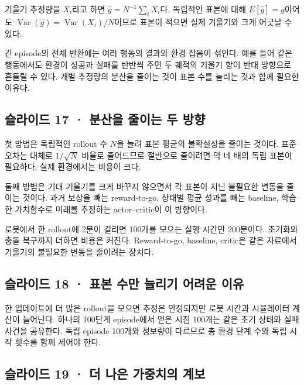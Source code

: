 \documentclass[11pt,a4paper]{article}
\begin{document}
기울기 추정량을 $X_i$라고 하면 $\widehat g=N^{-1}\sum_i X_i$다. 독립적인 표본에 대해 $E[\widehat g]=g$이어도 $\operatorname{Var}(\widehat g)=\operatorname{Var}(X_i)/N$이므로 표본이 적으면 실제 기울기와 크게 어긋날 수 있다.\par

긴 episode의 전체 반환에는 여러 행동의 결과와 환경 잡음이 섞인다. 예를 들어 같은 행동에서도 환경이 성공과 실패를 반반씩 주면 두 궤적의 기울기 항이 반대 방향으로 흔들릴 수 있다. 개별 추정량의 분산을 줄이는 것이 표본 수를 늘리는 것과 함께 필요한 이유다.\par

\subsection{슬라이드 17 · 분산을 줄이는 두 방향}

첫 방법은 독립적인 rollout 수 $N$을 늘려 표본 평균의 불확실성을 줄이는 것이다. 표준오차는 대체로 $1/\sqrt N$ 비율로 줄어드므로 절반으로 줄이려면 약 네 배의 독립 표본이 필요하다. 실제 환경에서는 비용이 크다.\par

둘째 방법은 기대 기울기를 크게 바꾸지 않으면서 각 표본이 지닌 불필요한 변동을 줄이는 것이다. 과거 보상을 빼는 reward-to-go, 상태별 평균 성과를 빼는 baseline, 학습한 가치함수로 미래를 추정하는 actor–critic이 이 방향이다.\par

로봇에서 한 rollout에 2분이 걸리면 100개를 모으는 실행 시간만 200분이다. 초기화와 충돌 복구까지 더하면 비용은 커진다. Reward-to-go, baseline, critic은 같은 자료에서 기울기의 불필요한 변동을 줄이려는 장치다.\par

\subsection{슬라이드 18 · 표본 수만 늘리기 어려운 이유}

한 업데이트에 더 많은 rollout을 모으면 추정은 안정되지만 로봇 시간과 시뮬레이터 계산이 늘어난다. 하나의 100단계 episode에서 얻은 시점 100개는 같은 초기 상태와 실패 사건을 공유한다. 독립 episode 100개와 정보량이 다르므로 총 환경 단계 수와 독립 시작 횟수를 함께 세어야 한다.\par

\subsection{슬라이드 19 · 더 나은 가중치의 계보}
\end{document}

